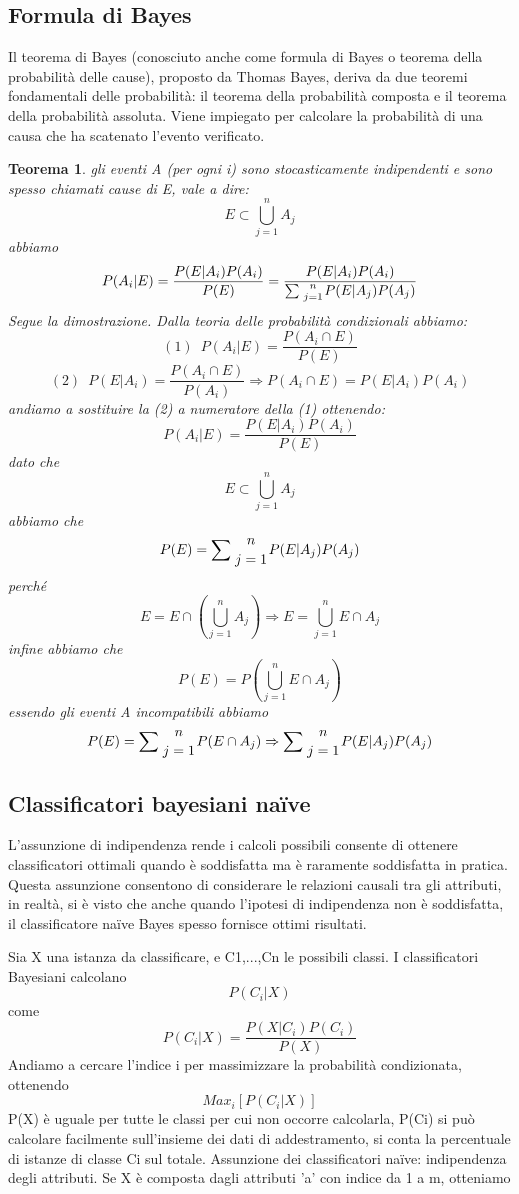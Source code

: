 \documentclass{article}
\theoremstyle{plain}
\newtheorem{thm}{Teorema}[]
\theoremstyle{definition}
\begin{document}
\subsection{Formula di Bayes}
Il teorema di Bayes (conosciuto anche come formula di Bayes o teorema della probabilità delle cause), proposto da Thomas Bayes, deriva da due teoremi fondamentali delle probabilità: il teorema della probabilità composta e il teorema della probabilità assoluta. Viene impiegato per calcolare la probabilità di una causa che ha scatenato l'evento verificato.\footnotemark
{}
\begin{thm}
	gli eventi A (per ogni i) sono stocasticamente indipendenti e sono spesso chiamati cause di E, vale a dire:
	$$E \subset \bigcup\limits_{j=1}^{n} A_j $$
	abbiamo
	$$P(A_{i}|E)={\frac  {P(E|A_{i})P(A_{i})}{P(E)}}={\frac  {P(E|A_{i})P(A_{i})}
		{\sum {n \atop j=1}P(E|A_{j})P(A_{j})}}$$
Segue la dimostrazione.\footnotemark
Dalla teoria delle probabilità condizionali abbiamo:
$$(1)\,\,\, P(A_i|E)=\frac{P(A_i\cap E)}{P(E)}$$
$$(2)\,\,\, P(E|A_i)=\frac{P(A_i\cap E)}{P(A_i)} \Rightarrow P(A_i\cap E)=P(E|A_i)P(A_i)$$
andiamo a sostituire la (2) a numeratore della (1) ottenendo: 
$$P(A_i|E)=\frac{P(E|A_i)P(A_i)}{P(E)}$$
dato che
$$E \subset \bigcup\limits_{j=1}^{n} A_j $$
abbiamo che
$$P(E)=\sum {n \atop j=1}P(E|A_{j})P(A_{j})$$
perché
$$E=E \cap (\bigcup\limits_{j=1}^{n} A_j) \Rightarrow E=\bigcup\limits_{j=1}^{n} E \cap A_j$$  
infine abbiamo che
$$P(E)=P(\bigcup\limits_{j=1}^{n} E \cap A_j)$$ 
essendo gli eventi A incompatibili abbiamo 
$$P(E)=\sum {n \atop j=1}P(E \cap A_{j}) \Rightarrow 
\sum {n \atop j=1}P(E|A_{j})P(A_{j})$$


\end{thm}
\subsection{Classificatori bayesiani naïve}
L'assunzione di indipendenza rende i calcoli possibili consente di ottenere classificatori ottimali quando è soddisfatta ma è raramente soddisfatta in pratica.
Questa assunzione consentono di considerare le relazioni causali tra gli attributi, in realtà, si è visto che anche quando l’ipotesi di indipendenza non è soddisfatta, il classificatore naïve Bayes spesso fornisce ottimi risultati.

Sia X una istanza da classificare, e C1,...,Cn le possibili classi. I classificatori Bayesiani calcolano $$P(C_i|X)$$ come $$P(C_i|X)=\frac{P(X|C_i)P(C_i)}{P(X)}$$
Andiamo a cercare l'indice i per massimizzare la probabilità condizionata, ottenendo $$Max_i [P(C_i|X)]$$
P(X) è uguale per tutte le classi per cui non occorre calcolarla, P(Ci) si può calcolare facilmente sull’insieme dei dati di addestramento, si conta la percentuale di istanze di classe Ci sul totale.
Assunzione dei classificatori naïve: indipendenza degli
attributi.
Se X è composta dagli attributi 'a' con indice da 1 a m, otteniamo
\end{document}
